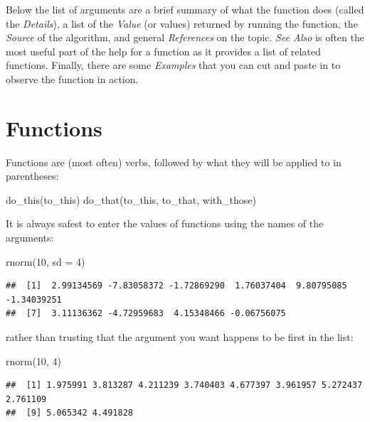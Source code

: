 \documentclass[
]{book}
\newenvironment{Shaded}{\begin{snugshade}}{\end{snugshade}}
\newcommand{\AttributeTok}[1]{\textcolor[rgb]{0.77,0.63,0.00}{#1}}
\newcommand{\DecValTok}[1]{\textcolor[rgb]{0.00,0.00,0.81}{#1}}
\newcommand{\FunctionTok}[1]{\textcolor[rgb]{0.00,0.00,0.00}{#1}}
\newcommand{\NormalTok}[1]{#1}
\begin{document}
Below the list of arguments are a brief summary of what the function does (called the \emph{Details}), a list of the \emph{Value} (or values) returned by running the function, the \emph{Source} of the algorithm, and general \emph{References} on the topic. \emph{See Also} is often the most useful part of the help for a function as it provides a list of related functions. Finally, there are some \emph{Examples} that you can cut and paste in to observe the function in action.

\hypertarget{functions}{%
\section{Functions}\label{functions}}

Functions are (most often) verbs, followed by what they will be applied to in parentheses:

\begin{Shaded}
\begin{Highlighting}[]
\FunctionTok{do\_this}\NormalTok{(to\_this)}
\FunctionTok{do\_that}\NormalTok{(to\_this, to\_that, with\_those)}
\end{Highlighting}
\end{Shaded}

It is always safest to enter the values of functions using the names of the arguments:

\begin{Shaded}
\begin{Highlighting}[]
\FunctionTok{rnorm}\NormalTok{(}\DecValTok{10}\NormalTok{, }\AttributeTok{sd =} \DecValTok{4}\NormalTok{)}
\end{Highlighting}
\end{Shaded}

\begin{verbatim}
##  [1]  2.99134569 -7.83058372 -1.72869290  1.76037404  9.80795085 -1.34039251
##  [7]  3.11136362 -4.72959683  4.15348466 -0.06756075
\end{verbatim}

rather than trusting that the argument you want happens to be first in the list:

\begin{Shaded}
\begin{Highlighting}[]
\FunctionTok{rnorm}\NormalTok{(}\DecValTok{10}\NormalTok{, }\DecValTok{4}\NormalTok{)}
\end{Highlighting}
\end{Shaded}

\begin{verbatim}
##  [1] 1.975991 3.813287 4.211239 3.740403 4.677397 3.961957 5.272437 2.761109
##  [9] 5.065342 4.491828
\end{verbatim}
\end{document}
